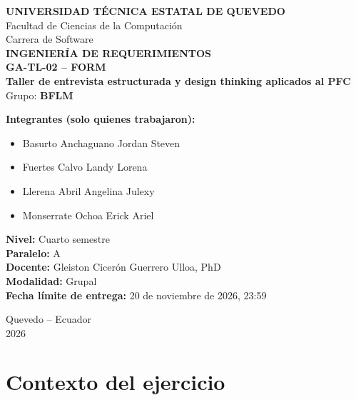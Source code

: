 \documentclass[12pt,a4paper]{article}
\begin{document}
\begin{titlepage}
    \centering

    {\large \textbf{UNIVERSIDAD TÉCNICA ESTATAL DE QUEVEDO}}\\[0.3cm]
    {\large Facultad de Ciencias de la Computación}\\
    {\large Carrera de Software}\\[1.5cm]

    {\Large \textbf{INGENIERÍA DE REQUERIMIENTOS}}\\[0.5cm]
  

    {\LARGE \textbf{GA-TL-02 -- FORM}}\\[0.9cm]

  

    {\large \textbf{Taller de entrevista estructurada y design thinking aplicados al PFC}}\\[0.3cm]
    {\normalsize Grupo: \textbf{BFLM}}\\

  

    \begin{flushleft}
    
        \textbf{Integrantes (solo quienes trabajaron):}
        \begin{itemize}[noitemsep,topsep=2pt]
            \item Basurto Anchaguano Jordan Steven
            \item Fuertes Calvo Landy Lorena
            \item Llerena Abril Angelina Julexy
            \item Monserrate Ochoa Erick Ariel
        \end{itemize}
        \vspace{0.2cm}
        \textbf{Nivel:} Cuarto semestre\\[0.4cm]
        \textbf{Paralelo:} A\\[0.4cm]
        \textbf{Docente:} Gleiston Cicerón Guerrero Ulloa, PhD\\[0.4cm]
        \textbf{Modalidad:} Grupal\\[0.4cm]
        \textbf{Fecha límite de entrega:} 20 de noviembre de 2026, 23:59
    \end{flushleft}
    \vfill
    {\large Quevedo -- Ecuador}\\
    {\large 2026}

\end{titlepage}

\section{Contexto del ejercicio}
\end{document}
